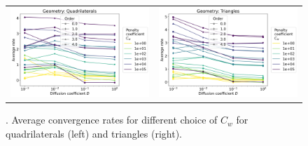 \begin{example}
\begin{figure}[h!]
	\centering
	\begin{tabular}{p{} p{}}
		\vspace{0pt}
		\includegraphics[width=.5\textwidth]{../figs/parametric/advdiff_2D/ord_quarteroni1_2_4}
		&
		\vspace{0pt}
		\includegraphics[width=.5\textwidth]{../figs/parametric/advdiff_2D/ord_quarteroni1_2_3}
	\end{tabular}
	\caption{. Average convergence rates for different choice of $C_w$
	for quadrilaterals (left) and triangles (right).}
	\label{fig:orders_quarteroni1}
\end{figure}
\end{example}


